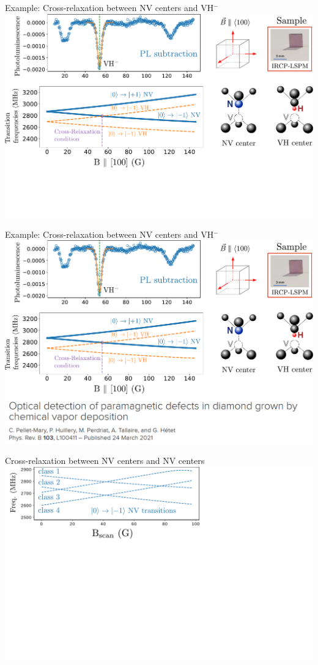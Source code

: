 \documentclass{beamer}
\begin{document}
\begin{frame}{Example: Cross-relaxation between NV centers and VH$^-$}
\centering
\includegraphics[width=\textwidth,height=0.85\textheight,keepaspectratio]{Slide_CR_VH_3}
\end{frame}

\begin{frame}{Example: Cross-relaxation between NV centers and VH$^-$}
\centering
\includegraphics[width=\textwidth,height=0.85\textheight,keepaspectratio]{Slide_CR_VH_4}
\end{frame}

\begin{frame}{Cross-relaxation between NV centers and NV centers}
\centering
\includegraphics[width=\textwidth,height=0.85\textheight,keepaspectratio]{Slide_CR_adamas_f-3}
\end{frame}
\end{document}
